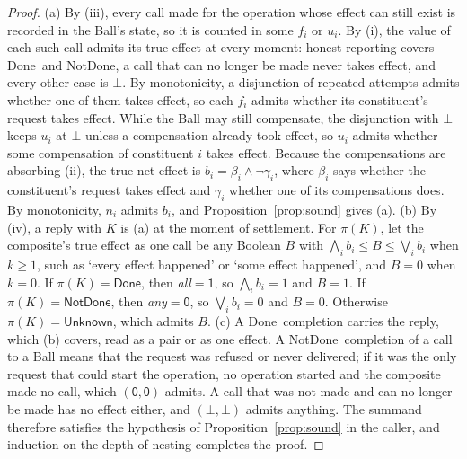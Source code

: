 \documentclass[11pt]{article}
\theoremstyle{definition}
\theoremstyle{plain}
\newcommand{\Done}{\textsf{Done}}
\newcommand{\NotDone}{\textsf{NotDone}}
\newcommand{\Unknown}{\textsf{Unknown}}
\newcommand{\yes}{\mathsf{1}}
\newcommand{\no}{\mathsf{0}}
\newcommand{\mayb}{\bot}
\begin{document}
\begin{proof}
(a) By (iii), every call made for the operation whose effect can still exist is recorded in the Ball's state, so it is counted in some $f_i$ or $u_i$. By (i), the value of each such call admits its true effect at every moment: honest reporting covers \Done\ and \NotDone, a call that can no longer be made never takes effect, and every other case is $\mayb$. By monotonicity, a disjunction of repeated attempts admits whether one of them takes effect, so each $f_i$ admits whether its constituent's request takes effect. While the Ball may still compensate, the disjunction with $\mayb$ keeps $u_i$ at $\mayb$ unless a compensation already took effect, so $u_i$ admits whether some compensation of constituent $i$ takes effect. Because the compensations are absorbing (ii), the true net effect is $b_i=\beta_i\wedge\neg\gamma_i$, where $\beta_i$ says whether the constituent's request takes effect and $\gamma_i$ whether one of its compensations does. By monotonicity, $n_i$ admits $b_i$, and Proposition~\ref{prop:sound} gives (a).
(b) By (iv), a reply with $K$ is (a) at the moment of settlement. For $\pi(K)$, let the composite's true effect as one call be any Boolean $B$ with $\bigwedge_i b_i\le B\le\bigvee_i b_i$ when $k\ge1$, such as `every effect happened' or `some effect happened', and $B=0$ when $k=0$. If $\pi(K)=\Done$, then \emph{all}${}=\yes$, so $\bigwedge_i b_i=1$ and $B=1$. If $\pi(K)=\NotDone$, then \emph{any}${}=\no$, so $\bigvee_i b_i=0$ and $B=0$. Otherwise $\pi(K)=\Unknown$, which admits $B$.
(c) A \Done\ completion carries the reply, which (b) covers, read as a pair or as one effect. A \NotDone\ completion of a call to a Ball means that the request was refused or never delivered; if it was the only request that could start the operation, no operation started and the composite made no call, which $(\no,\no)$ admits. A call that was not made and can no longer be made has no effect either, and $(\mayb,\mayb)$ admits anything. The summand therefore satisfies the hypothesis of Proposition~\ref{prop:sound} in the caller, and induction on the depth of nesting completes the proof.
\end{proof}
\end{document}
